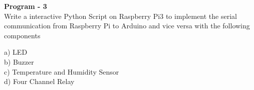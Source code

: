 \documentclass[12pt,a4paper]{article}
\begin{document}
\clearpage
\begin{center}
{\large {\textbf{Program - 3}}\\
Write a interactive Python Script on Raspberry Pi3 to implement the serial communication
from Raspberry Pi to Arduino and vice versa with the following components }\end{center}
{\large\begin{flushleft}{ 
a) LED \\
b) Buzzer \\
c) Temperature and Humidity Sensor  \\
d) Four Channel Relay} \\
\end{flushleft}}
\end{document}
